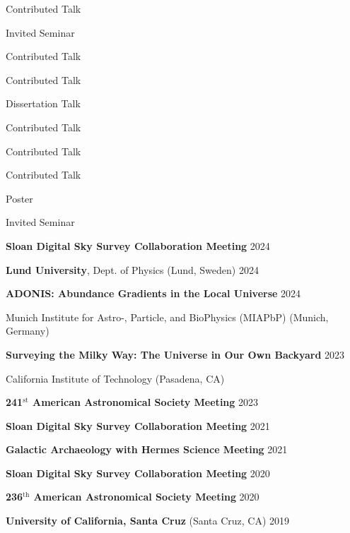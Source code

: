 \documentclass[cv.tex]{subfiles}
\begin{document}
\newpage
\noindent
\parbox{0.18\textwidth}{%
	\raggedleft
	Contributed Talk \par
	Invited Seminar \par
	Contributed Talk \par
	\null \par
	Contributed Talk \par
	\null \par
	Dissertation Talk \par
	Contributed Talk \par
	Contributed Talk \par
	Contributed Talk \par
	Poster \par
	Invited Seminar \par
}
\hspace{1mm}
\parbox{0.8\textwidth}{%
	\vspace{1mm}
	\textbf{Sloan Digital Sky Survey Collaboration Meeting} \hfill 2024 \par
	\textbf{Lund University}, Dept. of Physics (Lund, Sweden) \hfill 2024 \par
	\textbf{ADONIS: Abundance Gradients in the Local Universe}
	\hfill 2024 \par
	Munich Institute for Astro-, Particle, and BioPhysics (MIAPbP)
	(Munich, Germany) \par
	\textbf{Surveying the Milky Way: The Universe in Our Own Backyard}
	\hfill 2023 \par
	California Institute of Technology (Pasadena, CA) \par
	\textbf{241$^\text{st}$ American Astronomical Society Meeting}
	\hfill 2023 \par
	\textbf{Sloan Digital Sky Survey Collaboration Meeting}
	\hfill 2021 \par
	\textbf{Galactic Archaeology with Hermes Science Meeting}
	\hfill 2021 \par
	\textbf{Sloan Digital Sky Survey Collaboration Meeting}
	\hfill 2020 \par
	\textbf{236$^\text{th}$ American Astronomical Society Meeting}
	\hfill 2020 \par
	\textbf{University of California, Santa Cruz} (Santa Cruz, CA) \hfill 2019
	\par
}
\end{document}
